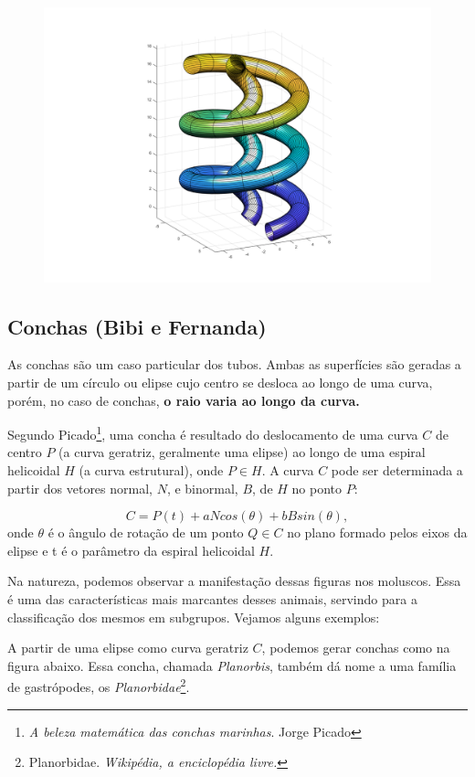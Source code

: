 \documentclass[a4paper]{article}
\begin{document}
\begin{figure}[h!]
  \caption{}
  \centering
  \includegraphics[width=1\textwidth]{doistubos.png}
\end{figure}

\newpage

\subsection{Conchas (Bibi e Fernanda)}
As conchas são um caso particular dos tubos. Ambas as superfícies são geradas a partir de um círculo ou elipse cujo centro se desloca ao longo de uma curva, porém, no caso de conchas, \textbf{o raio varia ao longo da curva.}

Segundo Picado\footnote{\textit{A beleza matemática das conchas marinhas}. Jorge Picado}, uma concha é resultado do deslocamento de uma curva $C$ de centro $P$ (a curva geratriz, geralmente uma elipse) ao longo de uma espiral helicoidal $H$ (a curva estrutural), onde $P \in H$. A curva $C$ pode ser determinada a partir dos vetores normal, $N$, e binormal, $B$, de $H$ no ponto $P$:

\[ C = P(t) + aNcos(\theta) + bBsin(\theta), \]
onde $\theta$ é o ângulo de rotação de um ponto $Q \in C$ no plano formado pelos eixos da elipse e t é o parâmetro da espiral helicoidal $H$.

Na natureza, podemos observar a manifestação dessas figuras nos moluscos. Essa é uma das características mais marcantes desses animais, servindo para a classificação dos mesmos em subgrupos. Vejamos alguns exemplos:

A partir de uma elipse como curva geratriz $C$, podemos gerar conchas como na figura abaixo. Essa concha, chamada \textit{Planorbis}, também dá nome a uma família de gastrópodes, os \textit{Planorbidae}\footnote{Planorbidae. \textit{Wikipédia, a enciclopédia livre.}}.
\end{document}
